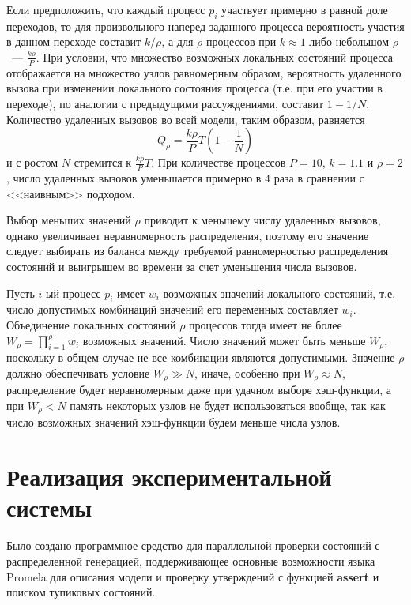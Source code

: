 \documentclass[12pt,a4paper,article]{bpm2}
\begin{document}
Если предположить, что каждый процесс $p_i$ участвует примерно в равной доле переходов, то для произвольного наперед заданного процесса вероятность участия в данном переходе составит $k/\rho$, а для $\rho$ процессов при $k \approx 1$ либо небольшом $\rho$~--- $\frac{k \rho}{P}$.
При условии, что множество возможных локальных состояний процесса отображается на множество узлов равномерным образом, вероятность удаленного вызова при изменении локального состояния процесса (т.е. при его участии в переходе), по аналогии с предыдущими рассуждениями, составит $1 - 1/N$. Количество удаленных вызовов во всей модели, таким образом, равняется
\[\label{eq:rpc-partproc}
  Q_\rho = \frac{k \rho}{P} T (1 - \frac{1}{N})
\]
и с ростом $N$ стремится к $\frac{k \rho}{P} T$. При количестве процессов $P = 10$, $k = 1.1$ и $\rho = 2$, число удаленных вызовов уменьшается примерно в 4 раза в сравнении с <<наивным>> подходом.

Выбор меньших значений $\rho$ приводит к меньшему числу удаленных вызовов, однако увеличивает неравномерность распределения, поэтому его значение следует выбирать из баланса между требуемой равномерностью распределения состояний и выигрышем во времени за счет уменьшения числа вызовов.

Пусть $i$-ый процесс $p_i$ имеет $w_i$ возможных значений локального состояний, т.е. число допустимых комбинаций значений его переменных составляет $w_i$.
Объединение локальных состояний $\rho$ процессов тогда имеет не более $W_\rho = \prod_{i=1}^{\rho}{w_i}$ возможных значений.
Число значений может быть меньше $W_\rho$, поскольку в общем случае не все комбинации являются допустимыми.
Значение $\rho$ должно обеспечивать условие $W_\rho \gg N$, иначе, особенно при $W_\rho \approx N$, распределение будет неравномерным даже при удачном выборе хэш-функции, а при $W_\rho < N$ память некоторых узлов не будет использоваться вообще, так как число возможных значений хэш-функции будем меньше числа узлов.

\section{Реализация экспериментальной системы}
\label{sec:implementation}

Было создано программное средство для параллельной проверки состояний с распределенной генерацией, поддерживающее основные возможности языка Promela для описания модели и проверку утверждений с функцией \textbf{assert} и поиском тупиковых состояний.
\end{document}
